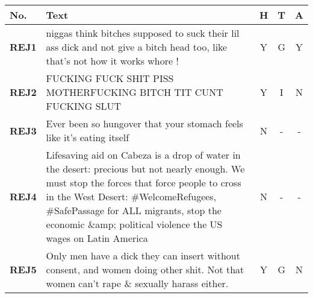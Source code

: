 \begin{table}[H]
    \small
    \centering
    \begin{tabular}{lp{10cm}ccc}
        \toprule
        \textbf{No.}  & \textbf{Text}                                                                                                                                                                                                                                                                                  & \multicolumn{1}{l}{\textbf{H}} & \multicolumn{1}{l}{\textbf{T}} & \multicolumn{1}{l}{\textbf{A}} \\
        \midrule
        \textbf{REJ1} & niggas think bitches supposed to suck their lil ass dick and not give a bitch head too, like that's not how it works whore !                                                                                                                                                                   & Y                              & G                              & Y                              \\
        \textbf{REJ2} & FUCKING FUCK SHIT PISS MOTHERFUCKING BITCH TIT CUNT FUCKING SLUT                                                                                                                                                                                                                               & Y                              & I                              & N                              \\
        \textbf{REJ3} & Ever been so hungover that your stomach feels like it's eating itself                                                                                                                                                                                                                          & N                              & -                              & -                              \\
        \textbf{REJ4} & Lifesaving aid on Cabeza is a drop of water in the desert: precious but not nearly enough. We must stop the forces that force people to cross in the West Desert: \#WelcomeRefugees, \#SafePassage for ALL migrants, stop the economic \&amp; political violence the US wages on Latin America & N                              & -                              & -                              \\
        \textbf{REJ5} & Only men have a dick they can insert without consent, and women doing other shit. Not that women can't rape \& sexually harass either.                                                                                                                                                         & Y                              & G                              & N                              \\

\end{tabular}
\end{table}
